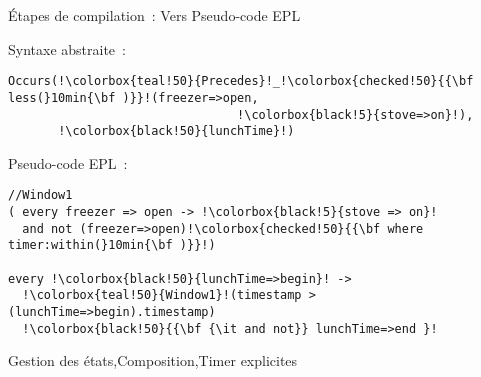 \begin{frame}[fragile]{Étapes de compilation~: Vers Pseudo-code EPL}
\addtocounter{framenumber}{-1}
  \begin{minipage}{.45\linewidth}
\vspace*{3.4mm}
      \begin{coloredbox}[black]{\tiny Syntaxe abstraite~:}
      \begin{lstlisting}[language=Maloya,basicstyle=\ttfamily\tiny,escapechar=!]
Occurs(!\colorbox{teal!50}{Precedes}!_!\colorbox{checked!50}{{\bf less(}10min{\bf )}}!(freezer=>open,
                                !\colorbox{black!5}{stove=>on}!),
       !\colorbox{black!50}{lunchTime}!)
      \end{lstlisting}
\end{coloredbox}
    \vfill
            \begin{coloredbox}[black]{\tiny Pseudo-code EPL~:}
      \begin{lstlisting}[language=EPLPseudoCode,basicstyle=\ttfamily\tiny,escapechar=!]
//Window1
( every freezer => open -> !\colorbox{black!5}{stove => on}! 
  and not (freezer=>open)!\colorbox{checked!50}{{\bf where timer:within(}10min{\bf )}}!) 

every !\colorbox{black!50}{lunchTime=>begin}! ->
  !\colorbox{teal!50}{Window1}!(timestamp > (lunchTime=>begin).timestamp)
  !\colorbox{black!50}{{\bf {\it and not}} lunchTime=>end }!
      \end{lstlisting}
\end{coloredbox}
  \end{minipage}
  \hfill
  \begin{minipage}{.52\linewidth}
    \vspace*{-65.3mm}
    \begin{tiny}
      \colorbox{black!50}{Gestion des états},\colorbox{teal!50}{Composition},\colorbox{checked!50}{Timer explicites}
    \end{tiny}

  \end{minipage}
\end{frame}

